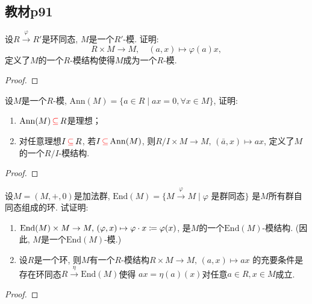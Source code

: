 \subsection{教材p91}

\begin{problem}
    设$R \xrightarrow{\varphi} R'$是环同态, $M$是一个$R'$-模.
证明: 
\[
    R \times M \to M,\quad (a, x) \mapsto \varphi(a)x,
\]
定义了$M$的一个$R$-模结构使得$M$成为一个$R$-模.
\end{problem}

\begin{proof}
    
\end{proof}

\begin{problem}
    设$M$是一个$R$-模, $\mathrm{Ann}(M) = \{a \in R \mid ax = 0, \forall x \in M\}$,
证明: 
\begin{enumerate}[(1)]
    \item $\mathrm{Ann}(M) \,\textcolor{red}{\subseteq}\, R$是理想；
    \item 对任意理想$I \,\textcolor{red}{\subseteq}\, R$, 若$I \,\textcolor{red}{\subseteq}\, \mathrm{Ann}(M)$,
则$R/I \times M \to M,\, (\bar{a},x) \mapsto ax$,
定义了$M$的一个$R/I$-模结构.
\end{enumerate}
\end{problem}

\begin{proof}
    
\end{proof}

\begin{problem}
    设$M = (M, +, 0)$是加法群, $\mathrm{End}(M) = \{M \xrightarrow{\varphi} M \mid \varphi \text{ 是群同态}\}$
    是$M$所有群自同态组成的环. 试证明: 
\begin{enumerate}[(1)]
    \item $\mathrm{End}(M) \times M \to M,\, (\varphi, x) \mapsto \varphi \cdot x \mathrel{\coloneqq} \varphi(x)$,
是$M$的一个$\mathrm{End}(M)$-模结构. (因此, $M$是一个$\mathrm{End}(M)$-模.)
    \item 设$R$是一个环, 则$M$有一个$R$-模结构$R \times M \to M,\, (a, x) \mapsto ax$
的充要条件是存在环同态$R \xrightarrow{\eta} \mathrm{End}(M)$使得
$ax = \eta(a)(x)$对任意$a \in R, x \in M$成立.
\end{enumerate}
\end{problem}

\begin{proof}

\end{proof}

